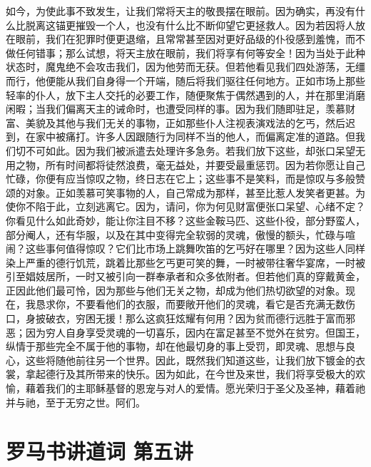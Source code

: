 如今，为使此事不致发生，让我们常将天主的敬畏摆在眼前。因为确实，再没有什么比脱离这锚更摧毁一个人，也没有什么比不断仰望它更拯救人。因为若因将人放在眼前，我们在犯罪时便更退缩，且常常甚至因对更好品级的仆役感到羞愧，而不做任何错事；那么试想，将天主放在眼前，我们将享有何等安全！因为当处于此种状态时，魔鬼绝不会攻击我们，因为他劳而无获。但若他看见我们四处游荡，无缰而行，他便能从我们自身得一个开端，随后将我们驱往任何地方。正如市场上那些轻率的仆人，放下主人交托的必要工作，随便聚焦于偶然遇到的人，并在那里消磨闲暇；当我们偏离天主的诫命时，也遭受同样的事。因为我们随即驻足，羡慕财富、美貌及其他与我们无关的事物，正如那些仆人注视表演戏法的乞丐，然后迟到，在家中被痛打。许多人因跟随行为同样不当的他人，而偏离定准的道路。但我们切不可如此。因为我们被派遣去处理许多急务。若我们放下这些，却张口呆望无用之物，所有时间都将徒然浪费，毫无益处，并要受最重惩罚。因为若你愿让自己忙碌，你便有应当惊叹之物，终日志在它上；这些事不是笑料，而是惊叹与多般赞颂的对象。正如羡慕可笑事物的人，自己常成为那样，甚至比惹人发笑者更甚。为使你不陷于此，立刻逃离它。因为，请问，你为何见财富便张口呆望、心绪不定？你看见什么如此奇妙，能让你注目不移？这些金鞍马匹、这些仆役，部分野蛮人，部分阉人，还有华服，以及在其中变得完全软弱的灵魂，傲慢的额头，忙碌与喧闹？这些事何值得惊叹？它们比市场上跳舞吹笛的乞丐好在哪里？因为这些人同样染上严重的德行饥荒，跳着比那些乞丐更可笑的舞，一时被带往奢华宴席，一时被引至娼妓居所，一时又被引向一群奉承者和众多依附者。但若他们真的穿戴黄金，正因此他们最可怜，因为那些与他们无关之物，却成为他们热切欲望的对象。现在，我恳求你，不要看他们的衣服，而要敞开他们的灵魂，看它是否充满无数伤口，身披破衣，穷困无援！那么这疯狂炫耀有何用？因为贫而德行远胜于富而邪恶；因为穷人自身享受灵魂的一切喜乐，因内在富足甚至不觉外在贫穷。但国王，纵情于那些完全不属于他的事物，却在他最切身的事上受罚，即灵魂、思想与良心，这些将随他前往另一个世界。因此，既然我们知道这些，让我们放下镀金的衣裳，拿起德行及其所带来的快乐。因为如此，在今世及来世，我们将享受极大的欢愉，藉着我们的主耶稣基督的恩宠与对人的爱情。愿光荣归于圣父及圣神，藉着祂并与祂，至于无穷之世。阿们。\par



\section{罗马书讲道词 第五讲}

